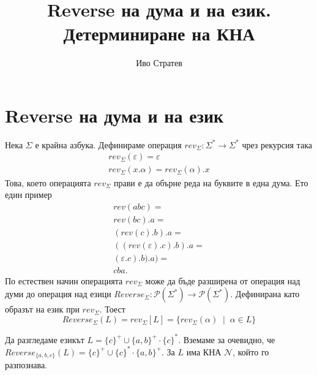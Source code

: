 \documentclass[12pt]{article}
\title{Reverse на дума и на език. Детерминиране на КНА}
\author{Иво Стратев}
\begin{document}
\maketitle

\section{Reverse на дума и на език}
Нека \(\Sigma\) е крайна азбука. Дефинираме операция \(rev_\Sigma : \Sigma^* \to \Sigma^*\) чрез рекурсия така
\begin{align*}
    rev_\Sigma(\varepsilon) = \varepsilon \\
    rev_\Sigma(x.\alpha) = rev_\Sigma(\alpha).x
\end{align*}
Това, което операцията \(rev_\Sigma\) прави е да обърне реда на буквите в една дума.
Ето един пример
\begin{align*}
    rev(abc) = \\
    rev(bc).a = \\
    (rev(c).b).a = \\
    ((rev(\varepsilon).c).b).a = \\
    (\varepsilon.c).b).a) = \\
    cba.
\end{align*}
По естествен начин операцията \(rev_\Sigma\) може да бъде разширена от операция над думи до операция над езици
\(Reverse_\Sigma : \mathcal{P}(\Sigma^*) \to \mathcal{P}(\Sigma^*)\).
Дефинирана като образът на език при \(rev_\Sigma\). Тоест
\[Reverse_\Sigma(L) = rev_\Sigma[L] = \{rev_\Sigma(\alpha) \;\mid\; \alpha \in L\}\]

Да разгледаме езикът \(L = \{c\}^+ \cup \{a, b\}^+ \cdot \{c\}^*\).
Вземаме за очевидно, че \(Reverse_{\{a,b, c\}}(L) = \{c\}^+ \cup \{c\}^* \cdot \{a, b\}^+\).
За \(L\) има КНА \(\mathcal{N}\), който го разпознава.

\begin{center}
\end{center}
\end{document}
